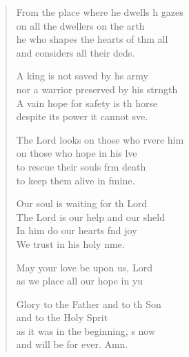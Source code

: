 \begin{verse}
\begin{patverse}
From the place where he dwells h gazes\\
    on all the dwellers on the arth\\
he who shapes the hearts of thm all\\
    and considers all their deds.

A king is not saved by h\pointup{\i}s army\\
    nor a warrior preserved by his strngth\\
A vain hope for safety is th horse\\
    despite its power it cannot sve.

The Lord looks on those who rvere him\\
    on those who hope in his lve\\
to rescue their souls frm death\\
    to keep them alive in fmine.

Our soul is waiting for th Lord\\
    The Lord is our help and our sh\pointup{\i}eld\\
In him do our hearts f\pointup{\i}nd joy\\
    We trust in his holy nme.

May your love be upon us,  Lord\\
    as we place all our hope in yu

Glory to the Father and to th Son\\
    and to the Holy Sp\pointup{\i}rit\\
as it was in the beginning, \pointup{\i}s now\\
    and will be for ever. Amn.
  \end{patverse}
\end{verse}
